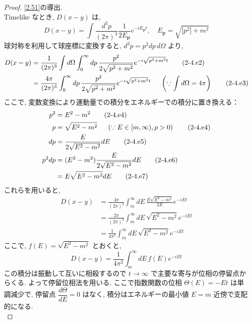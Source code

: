\documentclass[a4paper,12pt]{article}
\begin{document}
\begin{proof}
\eqref{2.51}の導出.\\
Timelike なとき, $D(x-y)$ は,
\begin{equation*}
  D(x-y) = \int \frac{d^3 p}{(2\pi)^3}\frac{1}{2E_{\mathbf{p}}}e^{-iE_{\mathbf{p}}t}, \quad E_{\mathbf{p}} = \sqrt{|p^2| + m^2} \tag{2-4.e1}
\end{equation*}
球対称を利用して球座標に変換すると, $d^3 p = p^2 dp\, d\Omega$ より,
\begin{align*}
  D(x-y) &= \frac{1}{(2\pi)^3}\int d\Omega \int_{0}^{\infty}dp\, \frac{p^2}{2\sqrt{p^2 + m^2}}e^{-i\sqrt{p^2 + m^2}t} \tag{2-4.e2}\\
  &= \frac{4\pi}{(2\pi)^3} \int_{0}^{\infty}dp\, \frac{p^2}{2\sqrt{p^2 + m^2}}e^{-i\sqrt{p^2 + m^2}t} \hspace{0.5cm} \left(\because \int d\Omega = 4\pi\right) \tag{2-4.e3}
\end{align*}
ここで, 変数変換により運動量での積分をエネルギーでの積分に置き換える：
\begin{align*}
  p^2 &= E^2 - m^2 \tag{2-4.e4}\\
  p &= \sqrt{E^2 - m^2} \hspace{0.5cm} \left(\because E \in [m, \infty), p > 0\right) \tag{2-4.e4}\\
  dp &= \frac{E}{2\sqrt{E^2 - m^2}}dE \tag{2-4.e5}\\
  p^2 dp &= (E^2 - m^2) \frac{E}{2\sqrt{E^2 - m^2}}dE \tag{2-4.e6}\\
  &= E\sqrt{E^2 - m^2} dE \tag{2-4.e7}
\end{align*}
これらを用いると,
\begin{align*}
  D(x-y) &= \frac{4\pi}{(2\pi)^3} \int_{m}^{\infty} dE\, \frac{E \sqrt{E^2 - m^2}}{2E}e^{-iE t} \tag{2-4.e8}\\
  &= \frac{2\pi}{(2\pi)^3} \int_{m}^{\infty} dE\, \sqrt{E^2 - m^2}e^{-iE t} \tag{2-4.e9}\\
  &= \frac{1}{4\pi^2} \int_{m}^{\infty} dE\, \sqrt{E^2 - m^2}e^{-iE t} \tag{2-4.e10}
\end{align*}
ここで, $f(E) = \sqrt{E^2 - m^2}$ とおくと,
\begin{equation*}
  D(x-y) = \frac{1}{4\pi^2} \int_{m}^{\infty} dE\, f(E) e^{-iE t} \tag{2-4.e11}
\end{equation*}
この積分は振動して互いに相殺するので $t \to \infty$ で主要な寄与が位相の停留点からくる. よって停留位相法を用いる. ここで指数関数の位相 $\Theta(E) = -E t$ は単調減少で, 停留点 $\dfrac{d \Theta}{d E} = 0$ はなく, 積分はエネルギーの最小値 $E = m$ 近傍で支配的になる.\\

\end{proof}
\end{document}
